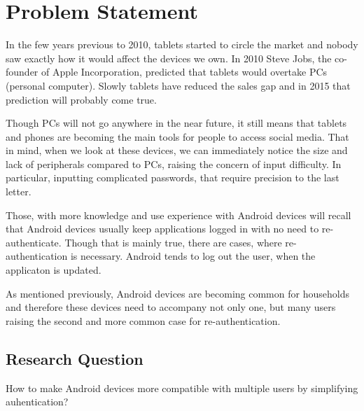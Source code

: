 
\chapter{Problem Statement} %


In the few years previous to 2010, tablets started to circle the market and nobody saw exactly how it would affect the devices we own. In 2010 Steve Jobs, the co-founder of Apple Incorporation, predicted that tablets would overtake PCs (personal computer). Slowly tablets have reduced the sales gap and in 2015 that prediction will probably come true. \cite{tabletsales}

Though PCs will not go anywhere in the near future, it still means that tablets and phones are becoming the main tools for people to access social media. That in mind, when we look at these devices, we can immediately notice the size and lack of peripherals compared to PCs, raising the concern of input difficulty. In particular, inputting complicated passwords, that require precision to the last letter. 

Those, with  more knowledge and use experience with Android devices will recall that Android devices usually keep applications logged in with no need to re-authenticate. Though that is mainly true, there are cases, where re-authentication is necessary. Android tends to log out the user, when the applicaton is updated. 

As mentioned previously, Android devices are becoming common for households and therefore these devices need to accompany not only one, but many users raising the second and more common case for re-authentication. 




\ifpdf
    \graphicspath{{X/figures/PNG/}{X/figures/PDF/}{X/figures/}}
\else
    \graphicspath{{X/figures/EPS/}{X/figures/}}
\fi


\section{Research Question}
How to make Android devices more compatible with multiple users by simplifying auhentication?




